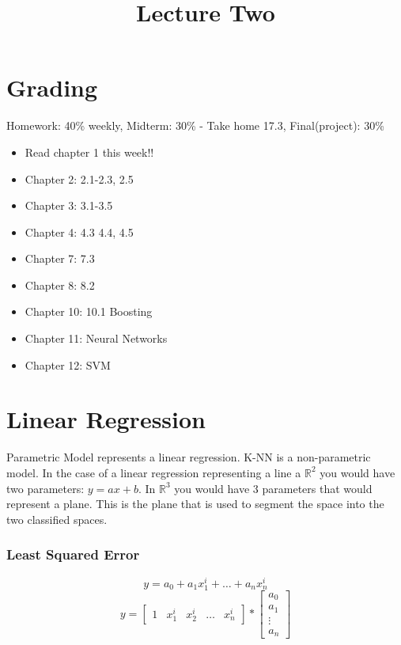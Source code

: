 \documentclass[letter, 9pt]{article}
\title{Lecture Two}
\begin{document}
\maketitle

\section{Grading}
Homework: 40\% weekly, Midterm: 30\% - Take home 17.3, Final(project): 30\%

\begin{itemize}
\item Read chapter 1 this week!!
\item Chapter 2: 2.1-2.3, 2.5
\item Chapter 3: 3.1-3.5
\item Chapter 4: 4.3 4.4, 4.5
\item Chapter 7: 7.3
\item Chapter 8: 8.2
\item Chapter 10: 10.1 Boosting
\item Chapter 11: Neural Networks
\item Chapter 12: SVM
\end{itemize}

\section{Linear Regression}
Parametric Model represents a linear regression. K-NN is a non-parametric model. In the case of a linear regression representing a line a $\mathbb{R}^2$ you would have two parameters: $y = ax + b$. In $\mathbb{R}^3$ you would have $3$ parameters that would represent a plane. This is the plane that is used to segment the space into the two classified spaces.

\subsubsection{Least Squared Error}
\begin{equation}
y = a_0 + a_1 x_1^i + \dots + a_n x_n^i
\end{equation}
\begin{equation}
y = \begin{bmatrix} 1 & x_1^i & x_2^i & \dots & x_n^i \end{bmatrix} * \begin{bmatrix} a_0\\a_1\\ \vdots \\ a_n\end{bmatrix}
\end{equation}
\end{document}
